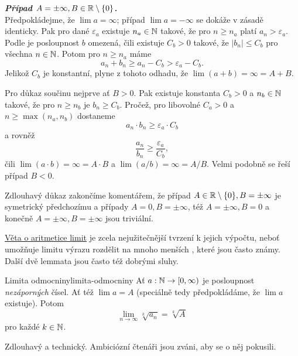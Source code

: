 \begin{thmproof}
 \textbf{\emph{Případ $A = \pm \infty, B \in \mathbb{R} \setminus \{0\}$.}}\\
 Předpokládejme, že $\lim a = \infty$; případ $\lim a = -\infty$ se dokáže v
 zásadě identicky. Pak pro dané $\varepsilon_a$ existuje $n_a \in \mathbb{N}$ takové, že
 pro $n \geq n_a$ platí $a_n > \varepsilon_a$. Podle
  je posloupnost $b$ omezená, čili
 existuje $C_b > 0$ takové, že $|b_n| \leq C_b$ pro všechna $n \in \mathbb{N}$. Potom
 pro $n \geq n_a$ máme
 \[
  a_n + b_n \geq a_n - C_b > \varepsilon_a - C_b.
 \]
 Jelikož $C_b$ je konstantní, plyne z tohoto odhadu, že $\lim (a + b) = \infty =
 A + B$.

 Pro důkaz součinu nejprve ať $B > 0$. Pak existuje konstanta $C_b > 0$ a $n_b
 \in \mathbb{N}$ takové, že pro $n \geq n_b$ je $b_n \geq C_b$. Pročež, pro libovolné
 $C_a > 0$ a $n \geq \max(n_a,n_b)$ dostaneme
 \[
  a_n \cdot b_n \geq \varepsilon_a \cdot C_b
 \]
 a rovněž
 \[
  \frac{a_n}{b_n} \geq \frac{\varepsilon_a}{C_b},
 \]
 čili $\lim (a \cdot b) = \infty = A \cdot B$ a $\lim (a / b) = \infty = A / B$.
 Velmi podobně se řeší případ $B < 0$.

 Zdlouhavý důkaz zakončíme komentářem, že případ $A \in \mathbb{R} \setminus \{0\}, B =
 \pm \infty$ je symetrický předchozímu a případy $A = 0, B = \pm \infty$, též $A
 = \pm \infty, B = 0$ a konečně $A = \pm \infty, B = \pm \infty$ jsou triviální.
\end{thmproof}

\hyperref[thm:aritmetika-limit]{Věta o aritmetice limit} je zcela nejužitečnější
tvrzení k jejich výpočtu, neboť umožňuje limitu výrazu rozdělit na mnoho menších
, které jsou často známy. Další dvě lemmata jsou často též dobrými
sluhy.

\begin{lemma}{Limita odmocniny}{limita-odmocniny}
 Ať $a:\mathbb{N} \to [0,\infty)$ je posloupnost \emph{nezáporných} čísel. Ať též
    $\lim a = A$ (speciálně tedy předpokládáme, že $\lim a$ existuje). Potom
 \[
  \lim_{n \to \infty} \sqrt[k]{a_n} = \sqrt[k]{A}
 \]
 pro každé $k \in \mathbb{N}$.
\end{lemma}
\begin{lemproof}
 Zdlouhavý a technický. Ambiciózní čtenáři jsou zváni, aby se o něj pokusili.
\end{lemproof}

